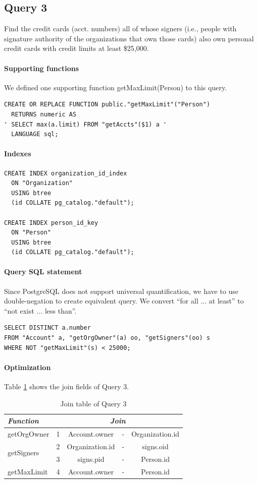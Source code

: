 \documentclass[11pt]{article}
\begin{document}
\subsection{Query 3}
Find the credit cards (acct. numbers) all of whose signers (i.e., people with signature authority of the organizations that own those cards) also own personal credit cards with credit limits at least \$25,000.

\paragraph{Supporting functions} We defined one supporting function getMaxLimit(Person) to this query.
\begin{verbatim}
CREATE OR REPLACE FUNCTION public."getMaxLimit"("Person")
  RETURNS numeric AS
' SELECT max(a.limit) FROM "getAccts"($1) a '
  LANGUAGE sql;
\end{verbatim}

\paragraph{Indexes}
\begin{verbatim}
CREATE INDEX organization_id_index
  ON "Organization"
  USING btree
  (id COLLATE pg_catalog."default");

CREATE INDEX person_id_key
  ON "Person"
  USING btree
  (id COLLATE pg_catalog."default");
\end{verbatim}

\paragraph{Query SQL statement} Since PostgreSQL does not support universal quantification, we have to use double-negation to create equivalent query. We convert ``for all ... at least'' to ``not exist ... less than''.
\begin{verbatim}
SELECT DISTINCT a.number
FROM "Account" a, "getOrgOwner"(a) oo, "getSigners"(oo) s
WHERE NOT "getMaxLimit"(s) < 25000;
\end{verbatim}

\paragraph{Optimization} Table \ref{tab:q3} shows the join fields of Query 3.

\begin{table}[!htbp]
\centering
\label{tab:q3}
\caption{Join table of Query 3}
\begin{tabular}{|l||r|c|l|c|}
\hline
{\itshape Function} & \multicolumn{4}{c|}{\itshape Join} \\
\hline
getOrgOwner & 1 & Account.owner & - & Organization.id \\
\hline
\multirow{2}{*}{getSigners} & 2 & Organization.id & - & signs.oid \\
\cline{2-5}
& 3 & signs.pid & - & Person.id \\
\hline
getMaxLimit & 4 & Account.owner & - & Person.id \\
\hline
\end{tabular}
\end{table}
\end{document}
